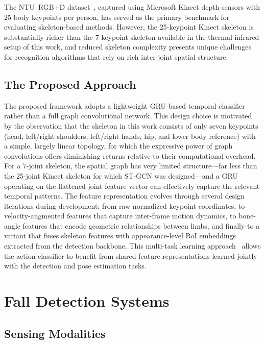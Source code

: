 The NTU~RGB+D dataset~\cite{shahroudy2016ntu}, captured using Microsoft Kinect depth sensors with 25 body keypoints per person, has served as the primary benchmark for evaluating skeleton-based methods. However, the 25-keypoint Kinect skeleton is substantially richer than the 7-keypoint skeleton available in the thermal infrared setup of this work, and reduced skeleton complexity presents unique challenges for recognition algorithms that rely on rich inter-joint spatial structure.

\subsection*{The Proposed Approach}

The proposed framework adopts a lightweight GRU-based temporal classifier rather than a full graph convolutional network. This design choice is motivated by the observation that the skeleton in this work consists of only seven keypoints (head, left/right shoulders, left/right hands, hip, and lower body reference) with a simple, largely linear topology, for which the expressive power of graph convolutions offers diminishing returns relative to their computational overhead. For a 7-joint skeleton, the spatial graph has very limited structure---far less than the 25-joint Kinect skeleton for which ST-GCN was designed---and a GRU operating on the flattened joint feature vector can effectively capture the relevant temporal patterns. The feature representation evolves through several design iterations during development: from raw normalized keypoint coordinates, to velocity-augmented features that capture inter-frame motion dynamics, to bone-angle features that encode geometric relationships between limbs, and finally to a variant that fuses skeleton features with appearance-level RoI embeddings extracted from the detection backbone. This multi-task learning approach~\cite{caruana1997multitask} allows the action classifier to benefit from shared feature representations learned jointly with the detection and pose estimation tasks.

\section{Fall Detection Systems}
\label{sec:rw_fall}

\subsection*{Sensing Modalities}


